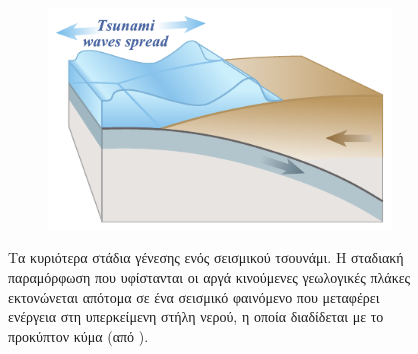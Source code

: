 \begin{figure}[h]
\begin{subfigure}{.5\textwidth}
  \end{subfigure}
  \begin{subfigure}{.5\textwidth}
    \centering
    \includegraphics[width=\textwidth]{figures/tsunami-gen-3.pdf}
  \end{subfigure}
  \caption[Γένεση τσουνάμι]{Τα κυριότερα στάδια γένεσης ενός σεισμικού τσουνάμι. Η
    σταδιακή παραμόρφωση που υφίστανται οι αργά κινούμενες γεωλογικές πλάκες εκτονώνεται
    απότομα σε ένα σεισμικό φαινόμενο που μεταφέρει ενέργεια στη υπερκείμενη στήλη νερού,
    η οποία διαδίδεται με το προκύπτον κύμα (από ).}
  \label{fig:tsunami-generation}
\end{figure}

